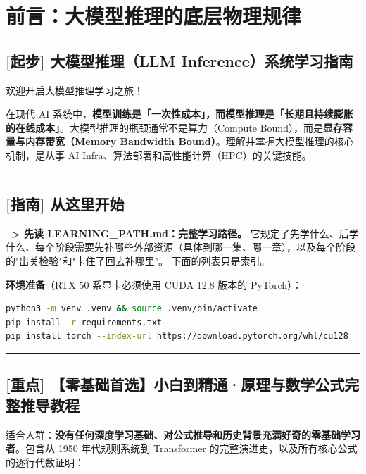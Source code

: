 \chapter*{前言：大模型推理的底层物理规律}
\section{[起步] 大模型推理（LLM Inference）系统学习指南}

欢迎开启大模型推理学习之旅！

在现代 AI 系统中，\textbf{模型训练是「一次性成本」，而模型推理是「长期且持续膨胀的在线成本」}。大模型推理的瓶颈通常不是算力（Compute Bound），而是\textbf{显存容量与内存带宽（Memory Bandwidth Bound）}。理解并掌握大模型推理的核心机制，是从事 AI Infra、算法部署和高性能计算（HPC）的关键技能。

\vspace{0.8em}\hrule\vspace{0.8em}

\section{[指南] 从这里开始}

\textbf{--> 先读 \textbf{LEARNING\_PATH.md：完整学习路径}。} 它规定了先学什么、后学什么、每个阶段需要先补哪些外部资源（具体到哪一集、哪一章），以及每个阶段的"出关检验"和"卡住了回去补哪里"。
下面的列表只是索引。

\textbf{环境准备}（RTX 50 系显卡必须使用 CUDA 12.8 版本的 PyTorch）：

\begin{lstlisting}[language=bash]
python3 -m venv .venv && source .venv/bin/activate
pip install -r requirements.txt
pip install torch --index-url https://download.pytorch.org/whl/cu128
\end{lstlisting}

\vspace{0.8em}\hrule\vspace{0.8em}

\section{[重点] 【零基础首选】小白到精通·原理与数学公式完整推导教程}

\begin{mathBox}[核心数学定理推导]
适合人群：\textbf{没有任何深度学习基础、对公式推导和历史背景充满好奇的零基础学习者}。包含从 1950 年代规则系统到 Transformer 的完整演进史，以及所有核心公式的逐行代数证明：
\end{mathBox}

